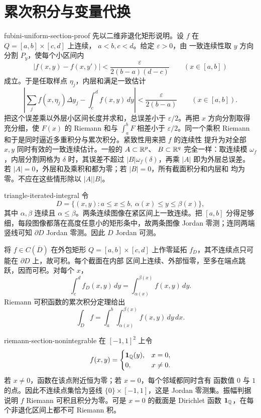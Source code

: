 \chapter{累次积分与变量代换}
\label{chap:fubini-change-variables-solutions}

\begin{solution}{fubini-uniform-section-proof}
先以二维非退化矩形说明。设 \(f\) 在 \(Q=[a,b]\times[c,d]\) 上连续，
$a<b,c<d$。给定 \(\varepsilon>0\)，由
一致连续性取 \(y\) 方向分割 \(P_y\)，使每个小区间内
\[
 |f(x,y)-f(x,y')|
 <\frac{\varepsilon}{2(b-a)(d-c)}
 \qquad(x\in[a,b])
\]
成立。于是任取样点 \(\eta_j\)，内层和满足一致估计
\[
 \left|\sum_j f(x,\eta_j)\Delta y_j-
       \int_c^d f(x,y)\,dy\right|
 <\frac{\varepsilon}{2(b-a)}
 \qquad(x\in[a,b]).
\]
把这个误差乘以外层小区间长度并求和，总误差小于
\(\varepsilon/2\)。再把 \(x\) 方向分割取得充分细，使 \(F(x)\) 的
Riemann 和与 \(\int_a^bF\) 相差小于 \(\varepsilon/2\)。同一个乘积
Riemann 和于是同时逼近多重积分与累次积分。紧致性用来把 \(f\) 的连续性
提升为对全部 \(x,y\) 同时有效的一致连续估计。一般的 $A\subset\mathbb{R}^p$、
$B\subset\mathbb{R}^q$ 完全一样：取连续模 $\omega_f$，内层分割网格为 $\delta$
时，其误差不超过 $|B|\omega_f(\delta)$，再乘 $|A|$ 即为外层总误差。
若 $|A|=0$，外层和及乘积和都为零；若 $|B|=0$，所有截面积分和内层和
均为零。不应在这些情形除以 $|A||B|$。
\end{solution}

\begin{solution}{triangle-iterated-integral}
令
\[
 D=\{(x,y):a\le x\le b,\ \alpha(x)\le y\le\beta(x)\},
\]
其中 \(\alpha,\beta\) 连续且 $\alpha\le\beta$。两条连续图像在紧区间上一致连续。把
\([a,b]\) 分得足够细，每段图像都落在高度任意小的矩形条中，故两条图像
Jordan 零测；连同两端竖线可知 \(\partial D\) Jordan 零测。因此 \(D\)
Jordan 可测。

将 $f\in C(\overline D)$ 在外包矩形 \(Q=[a,b]\times[c,d]\) 上作零延拓
$f_D$，其不连续点只可能在 \(\partial D\) 上，故可积。每个截面在内部
区间上连续、外部恒零，至多在端点跳跃，因而可积。对每个 \(x\)，
\[
 \int_c^d f_D(x,y)\,dy
 =\int_{\alpha(x)}^{\beta(x)}f(x,y)\,dy.
\]
Riemann 可积函数的累次积分定理给出
\[
 \int_Df
 =\int_a^b\int_{\alpha(x)}^{\beta(x)}f(x,y)\,dy\,dx.
\]
\end{solution}

\begin{solution}{riemann-section-nonintegrable}
在 \([-1,1]^2\) 上令
\[
 f(x,y)=
 \begin{cases}
  \mathbf1_{\mathbb{Q}}(y),&x=0,\\
  0,&x\ne0.
 \end{cases}
\]
若 \(x\ne0\)，函数在该点附近恒为零；若 \(x=0\)，每个邻域都同时含有
函数值 \(0\) 与 \(1\) 的点。因此不连续点集恰为竖线
\(\{0\}\times[-1,1]\)，这是 Jordan 零测集。振幅判据说明 \(f\)
Riemann 可积且积分为零。可是 \(x=0\) 的截面是 Dirichlet 函数
\(\mathbf1_{\mathbb{Q}}\)，在每个非退化区间上都不可 Riemann 积。
\end{solution}

